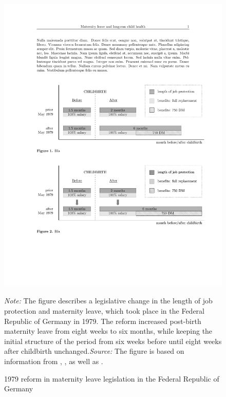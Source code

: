 \documentclass[a4paper ]{article}
\begin{document}
\begin{figure}[p]
\centering 
\includegraphics[width=\textwidth]{../../analysis/graphs/SOEP/reform.pdf}
\caption{1979 reform in maternity leave legislation in the Federal Republic of Germany}\label{fig: MLreform}
\begin{minipage}{\textwidth} 
{\footnotesize \textit{Note:} The figure describes a legislative change in the length of job protection and maternity leave, which took place in the Federal Republic of Germany in 1979. The reform increased post-birth maternity leave from eight weeks to six months, while keeping the initial structure of the period from six weeks before until eight weeks after childbirth unchanged.\newline \textit{Source: }The figure is based on information from \cite{dustmann2012expansions}, \cite{DIW2002}, \cite{schonberg2014expansions} as well as \cite{zmarzlik1999mutterschutzgesetz}.\par}
\end{minipage}
\end{figure}
\end{document}

